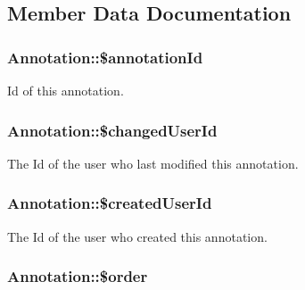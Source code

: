 \subsection{Member Data Documentation}
\hypertarget{classAnnotation_a7dc0510e40f9b6108be80f3aef415148}{
\subsubsection[{\$annotationId}]{\setlength{\rightskip}{0pt plus 5cm}Annotation::\$annotationId}}
\label{classAnnotation_a7dc0510e40f9b6108be80f3aef415148}
Id of this annotation. \hypertarget{classAnnotation_ae36f98c3c0cf771ec6a6a25c23235eb5}{
\subsubsection[{\$changedUserId}]{\setlength{\rightskip}{0pt plus 5cm}Annotation::\$changedUserId}}
\label{classAnnotation_ae36f98c3c0cf771ec6a6a25c23235eb5}
The Id of the user who last modified this annotation. \hypertarget{classAnnotation_a910abade9cc597b887cc80d211a0a951}{
\subsubsection[{\$createdUserId}]{\setlength{\rightskip}{0pt plus 5cm}Annotation::\$createdUserId}}
\label{classAnnotation_a910abade9cc597b887cc80d211a0a951}
The Id of the user who created this annotation. \hypertarget{classAnnotation_a2b06cc7e7fc220f58b94f45cb89cd223}{
\subsubsection[{\$order}]{\setlength{\rightskip}{0pt plus 5cm}Annotation::\$order}}
